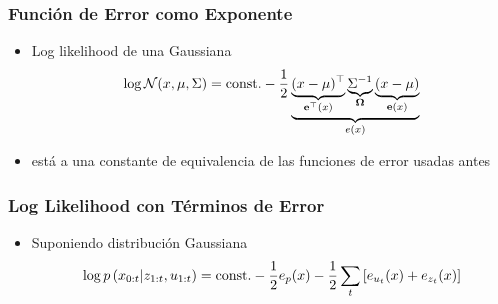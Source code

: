 \begin{frame}
    \frametitle{Función de Error como Exponente}
    
    \begin{itemize}
        \item Log likelihood de una Gaussiana
        \begin{equation*}
            \log \mathcal{N}(x, \mu, \Sigma) =  \text{const.} - \dfrac{1}{2} \underbrace{\underbrace{(x - \mu)^{\top}}_{\boldsymbol{\mathbf{e}}^{\top}(x)} \underbrace{{\Sigma}^{-1}}_{\boldsymbol{\mathbf{\Omega}}} \underbrace{(x - \mu)}_{\boldsymbol{\mathbf{e}}(x)}}_{e(x)}
        \end{equation*}
        \item está a una constante de equivalencia de las funciones de error usadas antes
    \end{itemize}
    
\end{frame}

\begin{frame}
    \frametitle{Log Likelihood con Términos de Error}
    
    \begin{itemize}
        \item Suponiendo distribución Gaussiana
        \begin{equation*}
            \log p\left( x_{0:t} | z_{1:t}, u_{1:t} \right) = \text{const.} - \dfrac{1}{2} e_{p}(x) -  \dfrac{1}{2} \sum_{t} \left[ e_{u_{t}}(x) + e_{z_{t}}(x)\right]
        \end{equation*}
    \end{itemize}
    
\end{frame}

